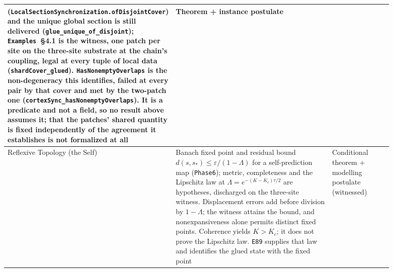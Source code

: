 \documentclass{article}
\begin{document}
\begin{longtable}{|>{\raggedright\arraybackslash}p{0.26\linewidth}|>{\raggedright\arraybackslash}p{0.46\linewidth}|>{\raggedright\arraybackslash}p{0.17\linewidth}|}
(\nolinkurl{LocalSectionSynchronization.ofDisjointCover}) and the unique global section is still delivered (\nolinkurl{glue_unique_of_disjoint}); \texttt{Examples}~\S4.1 is the witness, one patch per site on the three-site substrate at the chain's coupling, legal at every tuple of local data (\nolinkurl{shardCover_glued}). \nolinkurl{HasNonemptyOverlaps} is the non-degeneracy this identifies, failed at every pair by that cover and met by the two-patch one (\nolinkurl{cortexSync_hasNonemptyOverlaps}). It is a predicate and not a field, so no result above assumes it; that the patches' shared quantity is fixed independently of the agreement it establishes is not formalized at all & Theorem + instance postulate \\ \hline
Reflexive Topology (the Self) & Banach fixed point and residual bound $d(s,s_*)\leq\varepsilon/(1-\Lambda)$ for a self-prediction map (\texttt{Phase6}); metric, completeness and the Lipschitz law at $\Lambda=e^{-(K-K_c)\tau/2}$ are hypotheses, discharged on the three-site witness. Displacement errors add before division by $1-\Lambda$; the witness attains the bound, and nonexpansiveness alone permits distinct fixed points. Coherence yields $K>K_c$; it does not prove the Lipschitz law. \texttt{E89} supplies that law and identifies the glued state with the fixed point & Conditional theorem + modelling postulate (witnessed) \\ \hline

\end{longtable}
\end{document}
